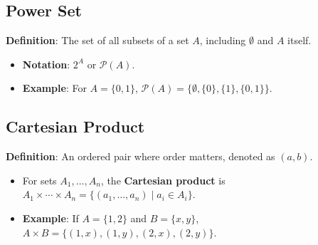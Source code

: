 \subsection{Power Set}

\textbf{Definition}: The set of all subsets of a set $A$, including $\emptyset$ and $A$ itself.
\begin{itemize}
    \item \textbf{Notation}: $2^A$ or $\mathcal{P}(A)$.
    \item \textbf{Example}: For $A = \{0,1\}$, $\mathcal{P}(A) = \{\emptyset, \{0\}, \{1\}, \{0,1\}\}$.
\end{itemize}

\subsection{Cartesian Product}

\textbf{Definition}: An ordered pair where order matters, denoted as $(a, b)$.
\begin{itemize}
    \item For sets $A_1, \ldots, A_n$, the \textbf{Cartesian product} is $A_1 \times \cdots \times A_n = \{ (a_1, \ldots, a_n) \mid a_i \in A_i \}$.
    \item \textbf{Example}: If $A = \{1,2\}$ and $B = \{x, y\}$, $A \times B = \{(1, x), (1, y), (2, x), (2, y)\}$.
\end{itemize}
